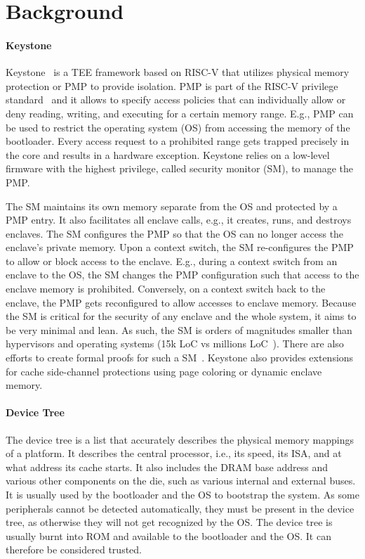 \section{Background}
\label{sec:background}

\paragraph*{Keystone}
Keystone~\cite{keystone} is a TEE framework based on RISC-V that utilizes physical memory protection or PMP to provide isolation. PMP is part of the RISC-V privilege standard~\cite{riscv2019privspec} and it allows to specify access policies that can individually allow or deny reading, writing, and executing for a certain memory range. E.g., PMP can be used to restrict the operating system (OS) from accessing the memory of the bootloader. Every access request to a prohibited range gets trapped precisely in the core and results in a hardware exception. Keystone relies on a low-level firmware with the highest privilege, called security monitor (SM), to manage the PMP. 

The SM maintains its own memory separate from the OS and protected by a PMP entry. It also facilitates all enclave calls, e.g., it creates, runs, and destroys enclaves. The SM configures the PMP so that the OS can no longer access the enclave's private memory. Upon a context switch, the SM re-configures the PMP to allow or block access to the enclave. E.g., during a context switch from an enclave to the OS, the SM changes the PMP configuration such that access to the enclave memory is prohibited. Conversely, on a context switch back to the enclave, the PMP gets reconfigured to allow accesses to enclave memory. 
Because the SM is critical for the security of any enclave and the whole system, it aims to be very minimal and lean. As such, the SM is orders of magnitudes smaller than hypervisors and operating systems (15k LoC vs millions LoC~\cite{torvalds2020linux,barham2003xen}). There are also efforts to create formal proofs for such a SM~\cite{lebedev2019sanctorum}. Keystone also provides extensions for cache side-channel protections using page coloring or dynamic enclave memory. 

\paragraph*{Device Tree}
The device tree is a list that accurately describes the physical memory mappings of a platform. It describes the central processor, i.e., its speed, its ISA, and at what address its cache starts. It also includes the DRAM base address and various other components on the die, such as various internal and external buses. It is usually used by the bootloader and the OS to bootstrap the system. As some peripherals cannot be detected automatically, they must be present in the device tree, as otherwise they will not get recognized by the OS. The device tree is usually burnt into ROM and available to the bootloader and the OS. It can therefore be considered trusted.

